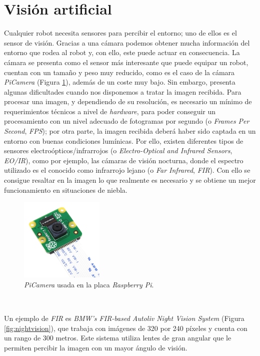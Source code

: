 \section{Visión artificial}
\label{sec:vision}
Cualquier robot necesita sensores para percibir el entorno; uno de ellos es el sensor de visión. Gracias a una cámara podemos obtener mucha información del entorno que rodea al robot y, con ello, este puede actuar en consecuencia. La cámara se presenta como el sensor más interesante que puede equipar un robot, cuentan con un tamaño y peso muy reducido, como es el caso de la cámara \textit{PiCamera} (Figura \ref{fig:picamera}), además de un coste muy bajo. Sin embargo, presenta algunas dificultades cuando nos disponemos a tratar la imagen recibida. Para procesar una imagen, y dependiendo de su resolución, es necesario un mínimo de requerimientos técnicos a nivel de \textit{hardware}, para poder conseguir un procesamiento con un nivel adecuado de fotogramas por segundo (o \textit{Frames Per Second}, \textit{FPS}); por otra parte, la imagen recibida deberá haber sido captada en un entorno con buenas condiciones lumínicas. Por ello, existen diferentes tipos de sensores electroópticos/infrarrojos (o \textit{Electro-Optical and Infrared Sensors}, \textit{EO/IR}), como por ejemplo, las cámaras de visión nocturna, donde el espectro utilizado es el conocido como infrarrojo lejano (o \textit{Far Infrared}, \textit{FIR}). Con ello se consigue resaltar en la imagen lo que realmente es necesario y se obtiene un mejor funcionamiento en situaciones de niebla.\\

\begin{figure} [h!]
	\begin{center}
		\includegraphics[width=4cm]{figs/picamera}
	\end{center}
	\caption{\textit{PiCamera} usada en la placa \textit{Raspberry Pi}.}
	\label{fig:picamera}
\end{figure}\

Un ejemplo de \textit{FIR} es \textit{BMW's FIR-based Autoliv Night Vision System} \cite{nightvision} (Figura \ref{fig:nightvision}), que trabaja con imágenes de 320 por 240 píxeles y cuenta con un rango de 300 metros. Este sistema utiliza lentes de gran angular que le permiten percibir la imagen con un mayor ángulo de visión.\\

